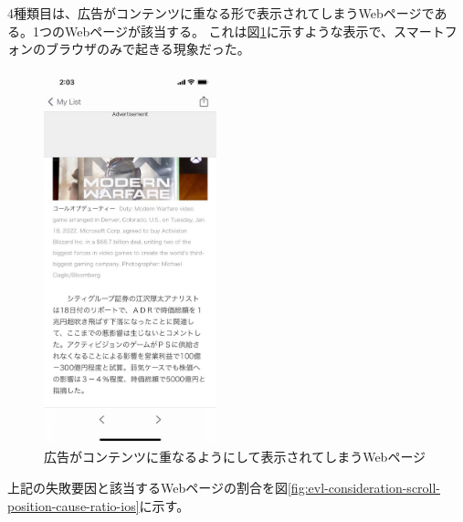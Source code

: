 
4種類目は、広告がコンテンツに重なる形で表示されてしまうWebページである。1つのWebページが該当する。
これは図\ref{fig:evl-consideration-scroll-position-example-ios-ad-overrap}に示すような表示で、スマートフォンのブラウザのみで起きる現象だった。

\begin{figure}[htbp]
  \label{fig:evl-consideration-scroll-position-example-ios-ad-overrap}
  \begin{center}
    \includegraphics[bb=0 0 585 1266,width=5cm]{img/060_evaluation/consideration/scroll_position/example/ios-ad-overrap.pdf}
  \end{center}
  \caption{広告がコンテンツに重なるようにして表示されてしまうWebページ}
\end{figure}

上記の失敗要因と該当するWebページの割合を図\ref{fig:evl-consideration-scroll-position-cause-ratio-ios}に示す。

